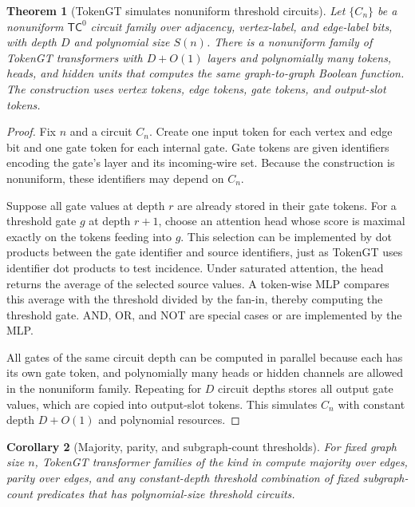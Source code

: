 \documentclass[11pt]{article}
\newtheorem{theorem}{Theorem}[section]
\newtheorem{corollary}[theorem]{Corollary}
\begin{document}
\begin{theorem}[TokenGT simulates nonuniform threshold circuits]
\label{thm:tc0-sim}
Let $\{C_n\}$ be a nonuniform $\mathsf{TC}^0$ circuit family over adjacency, vertex-label, and edge-label bits, with depth $D$ and polynomial size $S(n)$.  There is a nonuniform family of TokenGT transformers with $D+O(1)$ layers and polynomially many tokens, heads, and hidden units that computes the same graph-to-graph Boolean function.  The construction uses vertex tokens, edge tokens, gate tokens, and output-slot tokens.
\end{theorem}

\begin{proof}
Fix $n$ and a circuit $C_n$.  Create one input token for each vertex and edge bit and one gate token for each internal gate.  Gate tokens are given identifiers encoding the gate's layer and its incoming-wire set.  Because the construction is nonuniform, these identifiers may depend on $C_n$.

Suppose all gate values at depth $r$ are already stored in their gate tokens.  For a threshold gate $g$ at depth $r+1$, choose an attention head whose score is maximal exactly on the tokens feeding into $g$.  This selection can be implemented by dot products between the gate identifier and source identifiers, just as TokenGT uses identifier dot products to test incidence.  Under saturated attention, the head returns the average of the selected source values.  A token-wise MLP compares this average with the threshold divided by the fan-in, thereby computing the threshold gate.  AND, OR, and NOT are special cases or are implemented by the MLP.

All gates of the same circuit depth can be computed in parallel because each has its own gate token, and polynomially many heads or hidden channels are allowed in the nonuniform family.  Repeating for $D$ circuit depths stores all output gate values, which are copied into output-slot tokens.  This simulates $C_n$ with constant depth $D+O(1)$ and polynomial resources.
\end{proof}

\begin{corollary}[Majority, parity, and subgraph-count thresholds]
For fixed graph size $n$, TokenGT transformer families of the kind in  compute majority over edges, parity over edges, and any constant-depth threshold combination of fixed subgraph-count predicates that has polynomial-size threshold circuits.
\end{corollary}
\end{document}
